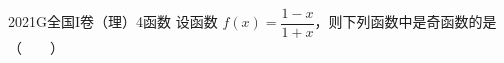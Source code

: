
\begin{problem}{2021}{G}{全国I卷（理）}{4}{函数}
设函数 $ f(x)=\dfrac{1-x}{1+x} $，则下列函数中是奇函数的是 \hspace{1cm}（　　）
\begin{choices}
\end{choices}
\end{problem}

\begin{answer}

\end{answer}

\begin{solutions}

\end{solutions}